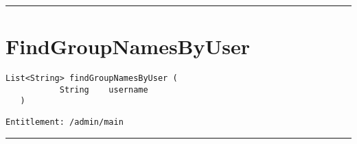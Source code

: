 \rule{12cm}{2pt}
\section{FindGroupNamesByUser}
\label{Api:FindGroupNamesByUser}
\begin{lstlisting}[style=nonumbers]
   List<String> findGroupNamesByUser (
           String    username
   )
\end{lstlisting}
\begin{Verbatim}[formatcom=\color{Maroon}]
  Entitlement: /admin/main
\end{Verbatim}



\rule{12cm}{2pt}
